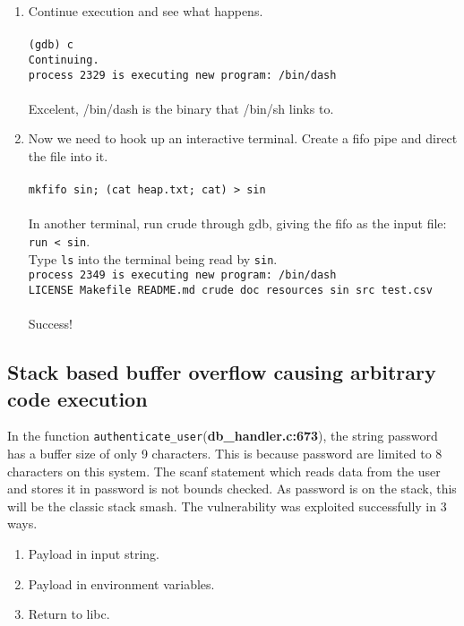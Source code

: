 \documentclass[]{article}
\begin{document}
\begin{enumerate}
	\item Continue execution and see what happens. 
	\\
	\\
	\texttt{(gdb) c\\
		Continuing.\\
		process 2329 is executing new program: /bin/dash}
	\\
	\\
	Excelent, /bin/dash is the binary that /bin/sh links to.
	\item Now we need to hook up an interactive terminal. Create a fifo pipe and direct the file into it.
	\\\\
	\texttt{mkfifo sin; (cat heap.txt; cat) > sin}
	\\
	\\
	In another terminal, run crude through gdb, giving the fifo as the input file: \texttt{run < sin}.\\
	Type \texttt{ls} into the terminal being read by \texttt{sin}.\\
	
	\texttt{process 2349 is executing new program: /bin/dash\\
		LICENSE  Makefile  README.md  crude  doc  resources  sin  src  test.csv}
	\\
	\\
	Success!
	
\end{enumerate}
\subsection*{Stack based buffer overflow causing arbitrary code execution}
In the function \texttt{authenticate\_user}(\textbf{db\_handler.c:673}), the string password has a buffer size of only 9 characters. This is because password are limited to 8 characters on this system. The scanf statement which reads data from the user and stores it in password is not bounds checked. As password is on the stack, this will be the classic stack smash. The vulnerability was exploited successfully in 3 ways.
\begin{enumerate}
	\item Payload in input string.
	\item Payload in environment variables.
	\item Return to libc.
\end{enumerate}
\end{document}

